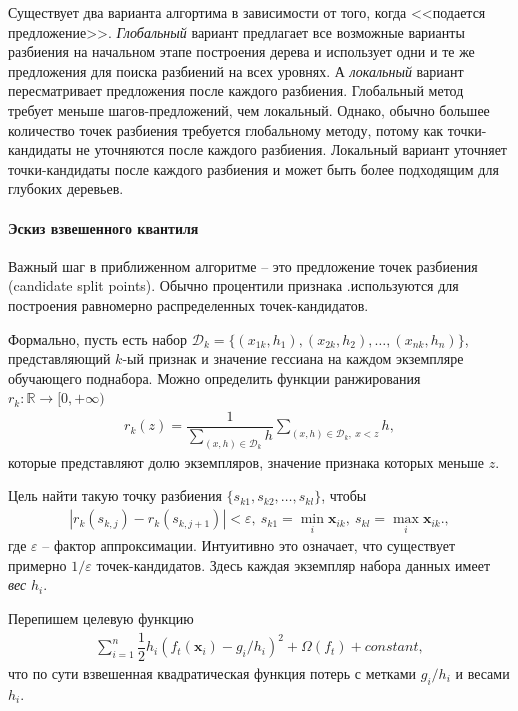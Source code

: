 \documentclass[%
	11pt,
	a4paper,
	utf8,
		]{article}
\begin{document}
Существует два варианта алгортима в зависимости от того, когда <<подается предложение>>. \emph{Глобальный} вариант предлагает все возможные варианты разбиения на начальном этапе построения дерева и использует одни и те же предложения для поиска разбиений на всех уровнях. А \emph{локальный} вариант пересматривает предложения после каждого разбиения. Глобальный метод требует меньше шагов-предложений, чем локальный. Однако, обычно большее количество точек разбиения требуется глобальному методу, потому как точки-кандидаты не уточняются после каждого разбиения. Локальный вариант уточняет точки-кандидаты после каждого разбиения и может быть более подходящим для глубоких деревьев.

\paragraph{Эскиз взвешенного квантиля}

Важный шаг в приближенном алгоритме -- это предложение точек разбиения (candidate split points). Обычно процентили признака .используются для построения равномерно распределенных точек-кандидатов.

Формально, пусть есть набор $ \mathcal{D}_k = \{ (x_{1k}, h_1), (x_{2k}, h_2), \ldots, (x_{nk}, h_n) \} $, представляющий $ k $-ый признак и значение гессиана на каждом экземпляре обучающего поднабора. Можно определить функции ранжирования $ r_k: \mathbb{R} \rightarrow [0, + \infty) $ 
\begin{align*}
	r_k(z) = \dfrac{1}{ \sum_{ (x, h) \in \mathcal{D}_k } h } \sum_{ (x, h) \in \mathcal{D}_k, \ x < z } h,
\end{align*}
которые представляют долю экземпляров, значение признака которых меньше $ z $.

Цель найти такую точку разбиения $ \{ s_{k1}, s_{k2}, \ldots, s_{kl} \} $, чтобы
\begin{align*}
	| r_k(s_{k, j}) - r_k(s_{k, j+1}) | < \varepsilon, \ s_{k1} = \min_i \mathbf{x}_{ik}, \ s_{kl} = \max_i \mathbf{x}_{ik}.,
\end{align*}
где $ \varepsilon $ -- фактор аппроксимации. Интуитивно это означает, что существует примерно $ 1 / \varepsilon $ точек-кандидатов. Здесь каждая экземпляр набора данных имеет \emph{вес} $ h_i $. 

Перепишем целевую функцию
\begin{align*}
	\sum_{i=1}^n \dfrac{1}{2} h_i (f_t(\mathbf{x}_i) - g_i / h_i)^2 + \Omega(f_t) + constant,
\end{align*}
что по сути взвешенная квадратическая функция потерь с метками $ g_i / h_i $ и весами $ h_i $.
\end{document}
